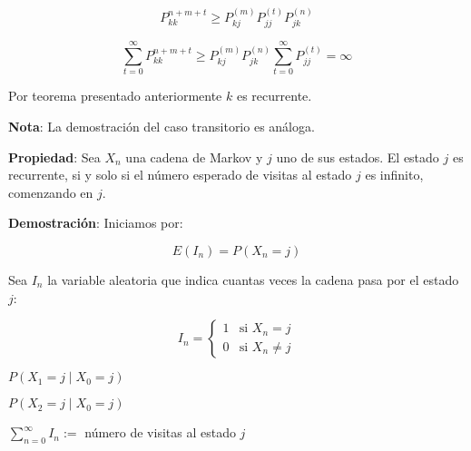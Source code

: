 \documentclass[12pt,a4paper]{article}
\begin{document}
\begin{equation*}
P_{kk}^{n+m+t} \geq P_{kj}^{(m)} P_{jj}^{(t)} P_{jk}^{(n)}
\end{equation*}

\begin{equation*}
\sum_{t=0}^{\infty} P_{kk}^{n+m+t} \geq P_{kj}^{(m)} P_{jk}^{(n)} \sum_{t=0}^{\infty} P_{jj}^{(t)} = \infty
\end{equation*}

Por teorema presentado anteriormente $k$ es recurrente.

\textbf{Nota}: La demostración del caso transitorio es análoga.

\textbf{Propiedad}: Sea $X_n$ una cadena de Markov y $j$ uno de sus estados. El estado $j$ es recurrente, si y solo si el número esperado de visitas al estado $j$ es infinito, comenzando en $j$.

\textbf{Demostración}: Iniciamos por:

\begin{equation*}
E(I_n) = P(X_n = j)
\end{equation*}

Sea $I_n$ la variable aleatoria que indica cuantas veces la cadena pasa por el estado $j$:

\begin{equation*}
I_n = \begin{cases}
1 & \text{si } X_n=j \\
0 & \text{si } X_n \neq j
\end{cases}
\end{equation*}

$P(X_1=j \mid X_0=j)$

$P(X_2=j \mid X_0=j)$

\begin{center}
\end{center}

$\sum_{n=0}^{\infty} I_n :=$ número de visitas al estado $j$
\end{document}
